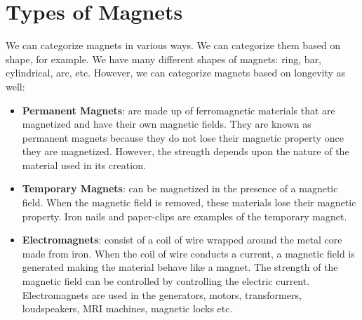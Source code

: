 \documentclass[9pt]{exam}
\begin{document}
	\section*{Types of Magnets}
	We can categorize magnets in various ways. We can categorize them based on shape, for example. We have many different shapes of magnets: ring, bar, cylindrical, arc, etc. However, we can categorize magnets based on longevity as well:
	\begin{itemize}
		\item \textbf{Permanent Magnets}: are made up of ferromagnetic materials that are magnetized and have their own magnetic fields.	They are known as permanent magnets because they do not lose their magnetic property once they are magnetized. However, the strength depends upon the nature of the material used in its creation.
		\item \textbf{Temporary Magnets}: can be magnetized in the presence of a magnetic field. When the magnetic field is removed, these materials lose their magnetic property. Iron nails and paper-clips are examples of the temporary magnet.
		\item \textbf{Electromagnets}: consist of a coil of wire wrapped around the metal core made from iron. When the coil of wire conducts a current, a magnetic field is generated making the material behave like a magnet. The strength of the magnetic field can be controlled by controlling the electric current. Electromagnets are used in the generators, motors, transformers, loudspeakers, MRI machines, magnetic locks etc.
	\end{itemize}
\end{document}
